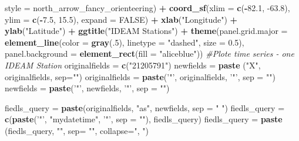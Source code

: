 \documentclass[12pt,twoside]{reedthesis}
\newenvironment{Shaded}{\begin{snugshade}}{\end{snugshade}}
\newcommand{\CommentTok}[1]{\textcolor[rgb]{0.56,0.35,0.01}{\textit{#1}}}
\newcommand{\DataTypeTok}[1]{\textcolor[rgb]{0.13,0.29,0.53}{#1}}
\newcommand{\DecValTok}[1]{\textcolor[rgb]{0.00,0.00,0.81}{#1}}
\newcommand{\FloatTok}[1]{\textcolor[rgb]{0.00,0.00,0.81}{#1}}
\newcommand{\KeywordTok}[1]{\textcolor[rgb]{0.13,0.29,0.53}{\textbf{#1}}}
\newcommand{\NormalTok}[1]{#1}
\newcommand{\OperatorTok}[1]{\textcolor[rgb]{0.81,0.36,0.00}{\textbf{#1}}}
\newcommand{\OtherTok}[1]{\textcolor[rgb]{0.56,0.35,0.01}{#1}}
\newcommand{\StringTok}[1]{\textcolor[rgb]{0.31,0.60,0.02}{#1}}
\begin{document}
\begin{Shaded}
\begin{Highlighting}[]
   \DataTypeTok{style =}\NormalTok{ north_arrow_fancy_orienteering) }\OperatorTok{+}\StringTok{ }
\StringTok{  }\KeywordTok{coord_sf}\NormalTok{(}\DataTypeTok{xlim =} \KeywordTok{c}\NormalTok{(}\OperatorTok{-}\FloatTok{82.1}\NormalTok{, }\FloatTok{-63.8}\NormalTok{), }\DataTypeTok{ylim =} \KeywordTok{c}\NormalTok{(}\OperatorTok{-}\FloatTok{7.5}\NormalTok{, }\FloatTok{15.5}\NormalTok{), }\DataTypeTok{expand =} \OtherTok{FALSE}\NormalTok{) }\OperatorTok{+}
\StringTok{  }\KeywordTok{xlab}\NormalTok{(}\StringTok{"Longitude"}\NormalTok{) }\OperatorTok{+}\StringTok{ }
\StringTok{  }\KeywordTok{ylab}\NormalTok{(}\StringTok{"Latitude"}\NormalTok{) }\OperatorTok{+}\StringTok{ }
\StringTok{  }\KeywordTok{ggtitle}\NormalTok{(}\StringTok{"IDEAM Stations"}\NormalTok{) }\OperatorTok{+}\StringTok{ }
\StringTok{  }\KeywordTok{theme}\NormalTok{(}\DataTypeTok{panel.grid.major =} \KeywordTok{element_line}\NormalTok{(}\DataTypeTok{color =} \KeywordTok{gray}\NormalTok{(.}\DecValTok{5}\NormalTok{), }\DataTypeTok{linetype =} \StringTok{"dashed"}\NormalTok{, }\DataTypeTok{size =} \FloatTok{0.5}\NormalTok{), }\DataTypeTok{panel.background =} \KeywordTok{element_rect}\NormalTok{(}\DataTypeTok{fill =} \StringTok{"aliceblue"}\NormalTok{))}
\CommentTok{#Plote time series - one IDEAM Station}
\NormalTok{originalfields =}\StringTok{ }\KeywordTok{c}\NormalTok{(}\StringTok{"21205791"}\NormalTok{)}
\NormalTok{newfields =}\StringTok{ }\KeywordTok{paste}\NormalTok{ (}\StringTok{"X"}\NormalTok{, originalfields, }\DataTypeTok{sep=}\StringTok{""}\NormalTok{)}
\NormalTok{originalfields =}\StringTok{ }\KeywordTok{paste}\NormalTok{(}\StringTok{'"'}\NormalTok{, originalfields, }\StringTok{'"'}\NormalTok{, }\DataTypeTok{sep =} \StringTok{""}\NormalTok{)}
\NormalTok{newfields =}\StringTok{ }\KeywordTok{paste}\NormalTok{(}\StringTok{'"'}\NormalTok{, newfields, }\StringTok{'"'}\NormalTok{, }\DataTypeTok{sep =} \StringTok{""}\NormalTok{)}

\NormalTok{fiedls_query =}\StringTok{ }\KeywordTok{paste}\NormalTok{(originalfields, }\StringTok{"as"}\NormalTok{, newfields, }\DataTypeTok{sep =} \StringTok{" "}\NormalTok{)}
\NormalTok{fiedls_query =}\StringTok{ }\KeywordTok{c}\NormalTok{(}\KeywordTok{paste}\NormalTok{(}\StringTok{'"'}\NormalTok{, }\StringTok{"mydatetime"}\NormalTok{, }\StringTok{'"'}\NormalTok{, }\DataTypeTok{sep =} \StringTok{""}\NormalTok{), fiedls_query)}
\NormalTok{fiedls_query =}\StringTok{ }\KeywordTok{paste}\NormalTok{ (fiedls_query, }\StringTok{""}\NormalTok{, }\DataTypeTok{sep=} \StringTok{""}\NormalTok{, }\DataTypeTok{collapse=}\StringTok{", "}\NormalTok{)}


\end{Highlighting}
\end{Shaded}
\end{document}
